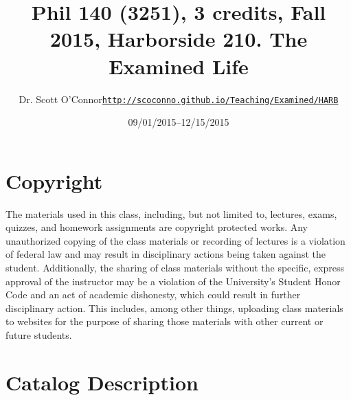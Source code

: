 \documentclass[article,oneside]{memoir}
\def\myauthor{Author}
\def\mytitle{Title}
\def\mycopyright{\myauthor}
\def\myweb{\href{http://scoconno.github.io/Teaching/Examined/HARB}{http://scoconno.github.io/Teaching/Examined/HARB}}
\def\myauthor{Dr. Scott O'Connor}
\def\mytitle{{\normalsize Phil 140 (3251), 3 credits, Fall 2015, Harborside 210. \newline} \HUGE The Examined Life}
\begin{document}
\setsansfont[Mapping=tex-text]{Georgia} 
\setmonofont[Mapping=tex-text,Scale=0.8]{Georgia} 

\def\ind{\hangindent=1 true cm\hangafter=1 \noindent}
\def\labelitemi{$\cdot$}

\pagestyle{kjh}

\title{\LARGE \mytitle}     
\author{\Large\myauthor \newline \footnotesize\texttt{\noindent\myweb}}
\date{09/01/2015--12/15/2015}

\published{\,}

\maketitle




%
%

\section{Copyright}
The materials used in this class, including, but not limited to, lectures, exams, quizzes, and homework assignments are copyright protected works.  Any unauthorized copying of the class materials or recording of lectures is a violation of federal law and may result in disciplinary actions being taken against the student.  Additionally, the sharing of class materials without the specific, express approval of the instructor may be a violation of the University's Student Honor Code and an act of academic dishonesty, which could result in further disciplinary action.  This includes, among other things, uploading class materials to websites for the purpose of sharing those materials with other current or future students. 

\section{Catalog Description}
\end{document}
